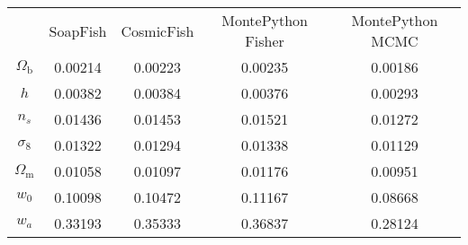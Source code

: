 \begin{table}
\centering
\begin{tabular}{|c|c|c|c|c|}
 & SoapFish & CosmicFish & MontePython Fisher & MontePython MCMC \\
$\Omega_\mathrm{b}$ & 0.00214 & 0.00223 & 0.00235 & 0.00186 \\
$h$ & 0.00382 & 0.00384 & 0.00376 & 0.00293 \\
$n_s$ & 0.01436 & 0.01453 & 0.01521 & 0.01272 \\
$\sigma_8$ & 0.01322 & 0.01294 & 0.01338 & 0.01129 \\
$\Omega_\mathrm{m}$ & 0.01058 & 0.01097 & 0.01176 & 0.00951 \\
$w_0$ & 0.10098 & 0.10472 & 0.11167 & 0.08668 \\
$w_a$ & 0.33193 & 0.35333 & 0.36837 & 0.28124 \\
\end{tabular}
\end{table}
